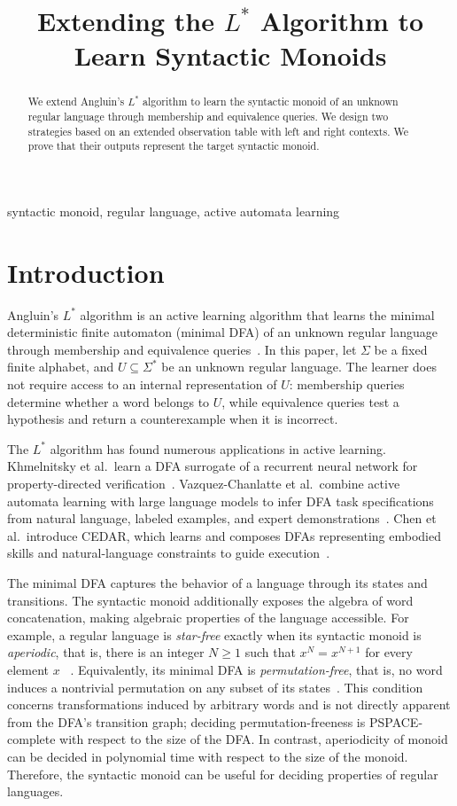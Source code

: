 \documentclass{ieice-tecrep}
\title{Extending the $L^*$ Algorithm to Learn Syntactic Monoids}
\subtitle{}
\begin{document}
\begin{abstract}
We extend Angluin's \(L^*\) algorithm to learn the syntactic monoid of an
unknown regular language through membership and equivalence queries. We design two
strategies based on an extended observation table with left and right contexts. 
We prove that their outputs
represent the target syntactic monoid.
\end{abstract}
\begin{keyword}
syntactic monoid, regular language, active automata learning
\end{keyword}
\maketitle

\section{Introduction}\label{introduction}

Angluin's \(L^*\) algorithm is an active learning algorithm that learns the minimal deterministic
finite automaton (minimal DFA) of an unknown regular language through
membership and equivalence queries~\cite{angluin87}. In this paper, let \(\Sigma\) be a fixed finite alphabet, 
and \(U\subseteq\Sigma^*\) be an unknown regular language. 
The learner does not require access to an internal representation of \(U\):
membership queries determine whether a word belongs to \(U\), while
equivalence queries test a hypothesis and return a counterexample when
it is incorrect.

The \(L^*\) algorithm has found numerous applications in active learning.
Khmelnitsky et al.\ learn a DFA
surrogate of a recurrent neural network for property-directed
verification~\cite{khmelnitsky2020property}.
Vazquez-Chanlatte et al.\ combine active automata learning with large
language models to infer DFA task specifications from natural language,
labeled examples, and expert demonstrations~\cite{vazquezchanlatte2025lstarlm}.
Chen et al.\ introduce CEDAR, which learns and composes DFAs
representing embodied skills and natural-language constraints to guide
execution~\cite{chen2026cedar}.

The minimal DFA captures the behavior of a language through its states
and transitions. The syntactic monoid additionally exposes the algebra
of word concatenation, making algebraic properties of the language
accessible. For example, a regular language is \emph{star-free} exactly when
its syntactic monoid is \emph{aperiodic}, that is, there is an integer \(N\ge1\) such that \(x^N=x^{N+1}\) for every
element \(x\) ~\cite{SCHUTZENBERGER1965190}.
Equivalently, its minimal DFA is \emph{permutation-free}, that is, no word induces
a nontrivial permutation on any subset of its
states~\cite{mcnaughton1971counterfree}. This condition concerns
transformations induced by arbitrary words and is not directly apparent
from the DFA's transition graph; deciding permutation-freeness is
PSPACE-complete with respect to the size of the DFA. In contrast, aperiodicity of monoid 
can be decided in polynomial time with respect to the size of the monoid.
Therefore, the syntactic monoid can be useful for deciding properties of regular languages. 
\end{document}
